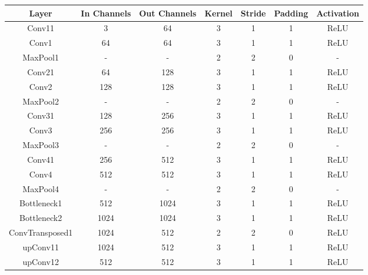 \documentclass{article}
\begin{document}
\begin{table}[h!]
  \centering
  \renewcommand{\arraystretch}{1.5}
  \begin{tabular}{|c|c|c|c|c|c|c|}
    \hline
    Layer           & In Channels & Out Channels & Kernel & Stride & Padding & Activation \\
    \hline
    Conv11          & 3           & 64           & 3      & 1      & 1       & ReLU       \\\hline
    Conv1           & 64          & 64           & 3      & 1      & 1       & ReLU       \\\hline
    MaxPool1        & -           & -            & 2      & 2      & 0       & -          \\\hline
    Conv21          & 64          & 128          & 3      & 1      & 1       & ReLU       \\\hline
    Conv2           & 128         & 128          & 3      & 1      & 1       & ReLU       \\\hline
    MaxPool2        & -           & -            & 2      & 2      & 0       & -          \\\hline
    Conv31          & 128         & 256          & 3      & 1      & 1       & ReLU       \\\hline
    Conv3           & 256         & 256          & 3      & 1      & 1       & ReLU       \\\hline
    MaxPool3        & -           & -            & 2      & 2      & 0       & -          \\\hline
    Conv41          & 256         & 512          & 3      & 1      & 1       & ReLU       \\\hline
    Conv4           & 512         & 512          & 3      & 1      & 1       & ReLU       \\\hline
    MaxPool4        & -           & -            & 2      & 2      & 0       & -          \\\hline
    Bottleneck1     & 512         & 1024         & 3      & 1      & 1       & ReLU       \\\hline
    Bottleneck2     & 1024        & 1024         & 3      & 1      & 1       & ReLU       \\\hline
    ConvTransposed1 & 1024        & 512          & 2      & 2      & 0       & ReLU       \\\hline
    upConv11        & 1024        & 512          & 3      & 1      & 1       & ReLU       \\\hline
    upConv12        & 512         & 512          & 3      & 1      & 1       & ReLU       \\\hline

\end{tabular}
\end{table}
\end{document}

